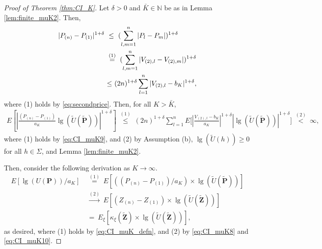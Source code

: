 \begin{proof}[Proof of Theorem \ref{thm:CI_K}]
Let $\delta >0$ and $\bar{K}\in \mathbb{N}$ be as in Lemma \ref{lem:finite_muK2}. Then,
\begin{align}
|P_{(n)}-P_{(1)}|^{1+\delta }~&\leq~(\sum_{l,m=1}^{n}|P_{l}-P_{m}|)^{1+\delta }\notag\\
~&\overset{(1)}{=}~(\sum_{l,m=1}^{n}|V_{(2),l}-V_{(2),m}|)^{1+\delta }\notag\\
~&{\leq }~(2n)^{1+\delta}\sum_{l=1}^{n}|V_{(2),l}-b_{K}|^{1+\delta },  \label{eq:CI_muK9}
\end{align}
where (1) holds by \eqref{eq:secondprice}. Then, for all $K>\bar{K}$, 
\begin{align}
E[ |\tfrac{(P_{(n)}-P_{(1)})}{a_{K}} \lg (\tilde{U}(\mathbf{\tilde{P}}))|^{1+\delta }] ~\overset{(1)}{\leq }~
(2n)^{1+\delta }\sum_{l=1}^{n}E\big[|\tfrac{V_{(2),l}-b_{K}}{a_{K}}|^{1+\delta } |\lg (\tilde{U}(\mathbf{\tilde{P}}))|^{1+\delta }\big] 
~\overset{(2)}{<}~\infty ,\label{eq:CI_muK10} 
\end{align}%
where (1) holds by \eqref{eq:CI_muK9}, and (2) by Assumption (b), $\lg (\tilde{U}(h))\geq 0$ for all $h \in \Sigma$, and Lemma \ref{lem:finite_muK2}.

Then, consider the following derivation as $K\to \infty $.
\begin{align*}
E[\lg (U(\mathbf{P}))/a_{K}]~&\overset{(1)}{=}~
E[(( P_{(n)}-P_{(1)}) /a_{K})\times \lg ( \tilde{U}(\mathbf{\tilde{P}}))] \\
~&\overset{(2)}{\to }~E[(Z_{(n)}-Z_{(1)})\times\lg (\tilde{U}(\mathbf{\tilde{Z}} ))]\\
~&=~E_{\xi }[\kappa _{\xi }(\mathbf{\tilde{Z}})\times\lg (\tilde{U}( \mathbf{\tilde{Z}}))],
\end{align*}
as desired, where (1) holds by \eqref{eq:CI_muK_defn}, and (2) by \eqref{eq:CI_muK8} and \eqref{eq:CI_muK10}.
\end{proof}

